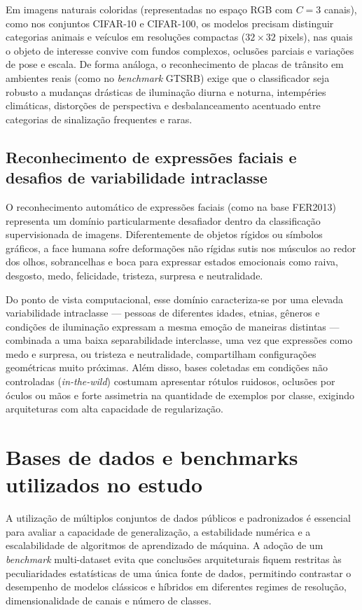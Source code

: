 \documentclass[
    12pt,
    openright,
    oneside,
    a4paper,
    english,
    brazil
]{abntex2}
\begin{document}
Em imagens naturais coloridas (representadas no espaço RGB com \(C=3\) canais), como nos conjuntos CIFAR-10 e CIFAR-100, os modelos precisam distinguir categorias animais e veículos em resoluções compactas (\(32 \times 32\) pixels), nas quais o objeto de interesse convive com fundos complexos, oclusões parciais e variações de pose e escala. De forma análoga, o reconhecimento de placas de trânsito em ambientes reais (como no \textit{benchmark} GTSRB) exige que o classificador seja robusto a mudanças drásticas de iluminação diurna e noturna, intempéries climáticas, distorções de perspectiva e desbalanceamento acentuado entre categorias de sinalização frequentes e raras.

\subsection{Reconhecimento de expressões faciais e desafios de variabilidade intraclasse}

O reconhecimento automático de expressões faciais (como na base FER2013) representa um domínio particularmente desafiador dentro da classificação supervisionada de imagens. Diferentemente de objetos rígidos ou símbolos gráficos, a face humana sofre deformações não rígidas sutis nos músculos ao redor dos olhos, sobrancelhas e boca para expressar estados emocionais como raiva, desgosto, medo, felicidade, tristeza, surpresa e neutralidade.

Do ponto de vista computacional, esse domínio caracteriza-se por uma elevada variabilidade intraclasse --- pessoas de diferentes idades, etnias, gêneros e condições de iluminação expressam a mesma emoção de maneiras distintas --- combinada a uma baixa separabilidade interclasse, uma vez que expressões como medo e surpresa, ou tristeza e neutralidade, compartilham configurações geométricas muito próximas. Além disso, bases coletadas em condições não controladas (\textit{in-the-wild}) costumam apresentar rótulos ruidosos, oclusões por óculos ou mãos e forte assimetria na quantidade de exemplos por classe, exigindo arquiteturas com alta capacidade de regularização.

\section{Bases de dados e benchmarks utilizados no estudo}

A utilização de múltiplos conjuntos de dados públicos e padronizados é essencial para avaliar a capacidade de generalização, a estabilidade numérica e a escalabilidade de algoritmos de aprendizado de máquina. A adoção de um \textit{benchmark} multi-dataset evita que conclusões arquiteturais fiquem restritas às peculiaridades estatísticas de uma única fonte de dados, permitindo contrastar o desempenho de modelos clássicos e híbridos em diferentes regimes de resolução, dimensionalidade de canais e número de classes.
\end{document}
